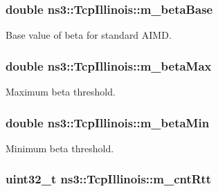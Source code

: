 \subsubsection[{\texorpdfstring{m\+\_\+beta\+Base}{m_betaBase}}]{\setlength{\rightskip}{0pt plus 5cm}double ns3\+::\+Tcp\+Illinois\+::m\+\_\+beta\+Base\hspace{0.3cm}{\ttfamily [private]}}\hypertarget{classns3_1_1TcpIllinois_a934a50369de8be5dc9377f0460d5a7e1}{}\label{classns3_1_1TcpIllinois_a934a50369de8be5dc9377f0460d5a7e1}


Base value of beta for standard A\+I\+MD. 

\subsubsection[{\texorpdfstring{m\+\_\+beta\+Max}{m_betaMax}}]{\setlength{\rightskip}{0pt plus 5cm}double ns3\+::\+Tcp\+Illinois\+::m\+\_\+beta\+Max\hspace{0.3cm}{\ttfamily [private]}}\hypertarget{classns3_1_1TcpIllinois_a8c27408a958faaf52111b0f62b8c81a5}{}\label{classns3_1_1TcpIllinois_a8c27408a958faaf52111b0f62b8c81a5}


Maximum beta threshold. 

\subsubsection[{\texorpdfstring{m\+\_\+beta\+Min}{m_betaMin}}]{\setlength{\rightskip}{0pt plus 5cm}double ns3\+::\+Tcp\+Illinois\+::m\+\_\+beta\+Min\hspace{0.3cm}{\ttfamily [private]}}\hypertarget{classns3_1_1TcpIllinois_a3c0c450a135f937b79940f82c67313d9}{}\label{classns3_1_1TcpIllinois_a3c0c450a135f937b79940f82c67313d9}


Minimum beta threshold. 

\subsubsection[{\texorpdfstring{m\+\_\+cnt\+Rtt}{m_cntRtt}}]{\setlength{\rightskip}{0pt plus 5cm}uint32\+\_\+t ns3\+::\+Tcp\+Illinois\+::m\+\_\+cnt\+Rtt\hspace{0.3cm}{\ttfamily [private]}}\hypertarget{classns3_1_1TcpIllinois_a60caf4d41dc12eaf51e6fa4d2bc37cf9}{}\label{classns3_1_1TcpIllinois_a60caf4d41dc12eaf51e6fa4d2bc37cf9}


